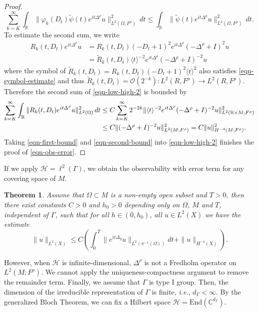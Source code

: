 \documentclass[11pt,oneside,reqno]{amsart}
\newcommand\R{\ensuremath{\mathbb{R}}}
\newtheorem{theorem}{Theorem}[section]
\theoremstyle{definition}
\numberwithin{equation}{section}
\theoremstyle{plain}
\begin{document}
\begin{proof}
\begin{equation}
        \sum_{k=K}^\infty \int_\R \|\varphi_k(D_t) \widetilde{\psi}(t)e^{it\Delta^\rho} u\|^2_{L^2(\Omega,F^\rho)}\,d t\le  \int_\R \| \widetilde{\psi}(t)e^{it\Delta^\rho} u\|^2_{L^2(\Omega,F^\rho)}\,d t.\label{eqn-first-bound}
    \end{equation}
    To estimate the second sum, we write
    \begin{equation*}
        \begin{aligned}
            R_k(t,D_t) e^{it\Delta^\rho}u&=R_k(t,D_t)(-D_t+1)^2 e^{it\Delta^\rho}(-\Delta^\rho+I)^2 u\\
            &=\widetilde{R}_k(t,D_t)\langle t\rangle^{-2} e^{it\Delta^\rho} (-\Delta^\rho+I)^{-2} u
        \end{aligned}
    \end{equation*}
    where the symbol of $\widetilde{R}_k(t,D_t)= R_k(t,D_t)(-D_t+1)^2\langle t\rangle^2$ also satisfies \eqref{eqn-symbol-estimate} and thus $\widetilde{R}_k(t,D_t)=\mathcal{O}(2^{-k}):L^2(R,F^\rho)\to L^2(R,F^\rho)$. Therefore the second sum of \eqref{eqn-low-high-2} is bounded by 
    \begin{align}
        \sum_{k=K}^\infty \int_\R \|R_k(t,D_t) e^{it\Delta^\rho} u\|^2_{L^2(\Omega)} \,d t &\le C\sum_{k=K}^\infty 2^{-2k} \|\langle t\rangle^{-2} e^{it\Delta^\rho}(-\Delta^\rho+I)^{-2} u\|^2_{L^2(\R\times M;F^{\rho})}\notag\\
        &\le C \| (-\Delta^\rho+I)^{-2}u\|^2_{L^2(M;F^\rho)}=C\|u\|^2_{H^{-4}(M;F^\rho)}.\label{eqn-second-bound}
    \end{align}
    Taking \eqref{eqn-first-bound} and \eqref{eqn-second-bound} into \eqref{eqn-low-high-2} finishes the proof of \eqref{eqn-obs-error}.
\end{proof}
If we apply $\mathcal{H}=\ell^2(\Gamma)$, we obtain the observability with error term for any covering space of $M$.

\begin{theorem}
Assume that $\Omega \subset M$ is a non-empty open subset and $T>0$, then there exist constants $C>0$ and $h_0>0$ depending only on $\Omega$, $M$ and $T$, independent of $\Gamma$, such that for all $h \in\left(0, h_0\right)$, all $u \in L^2(X)$ we have the estimate
$$
\|u\|_{L^2(X)} \leq C\left(\int_{0}^{T}\|e^{it\Delta_g}u\|_{L^2(\pi^{-1}(\Omega))}dt+\|u\|_{H^{-4}(X)}\right) .
$$
\end{theorem}

However, when $\mathcal{H}$ is infinite-dimensional, $\Delta^{\rho}$ is not a Fredholm operator on $L^2(M;F^{\rho})$. We cannot apply the uniqueness-compactness argument to remove the remainder term. Finally, we assume that $\Gamma$ is type I group. Then, the dimension of the irreducible representation of $\Gamma$ is finite, \emph{i.e.}, $d_\Gamma<\infty$. By the generalized Bloch Theorem, we can fix a Hilbert space $\mathcal{H}=\mathrm{End}(\mathbb{C}^{d_\Gamma})$.
\end{document}
